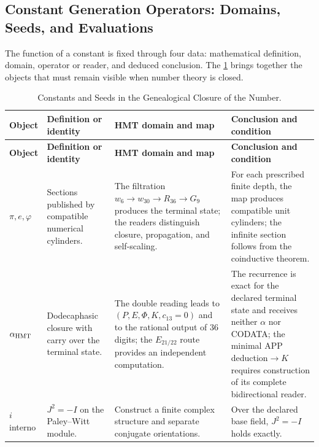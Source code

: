 \subsection{Constant Generation Operators: Domains, Seeds, and Evaluations}

The function of a constant is fixed through four data: mathematical
definition, domain, operator or reader, and deduced conclusion. The
\cref{p3-83-c44-s2:tab:semillas-cierre-genealogico-numero} brings together the objects that must
remain visible when number theory is closed.

\begingroup
\small
\setlength{\LTpre}{0.5\baselineskip}
\setlength{\LTpost}{0.5\baselineskip}
\begin{longtable}{@{}>{\raggedright\arraybackslash}p{}
                    >{\raggedright\arraybackslash}p{}
                    >{\raggedright\arraybackslash}p{}
                    >{\raggedright\arraybackslash}p{}@{}}
\caption{Constants and Seeds in the Genealogical Closure of the Number.}
\label{p3-83-c44-s2:tab:semillas-cierre-genealogico-numero}\\
\toprule
\textbf{Object} & \textbf{Definition or identity} &
\textbf{HMT domain and map} & \textbf{Conclusion and condition}\\
\midrule
\endfirsthead
\toprule
\textbf{Object} & \textbf{Definition or identity} &
\textbf{HMT domain and map} & \textbf{Conclusion and condition}\\
\midrule
\endhead
\(\pi,e,\varphi\) &
Sections published by compatible numerical cylinders. &
The filtration
\(w_6\to w_{30}\to R_{36}\to G_9\) produces the terminal state; the readers
distinguish closure, propagation, and self-scaling. &
For each prescribed finite depth, the map produces compatible unit
cylinders; the infinite section follows from the coinductive theorem.\\
\(\alpha_{\rm HMT}\) &
Dodecaphasic closure with carry over the terminal state. &
The double reading leads to
\((P,E,\Phi,K,c_{13}=0)\) and to the rational output of \(36\) digits; the
\(E_{21/22}\) route provides an independent computation. &
The recurrence is exact for the declared terminal state and receives neither
\(\alpha\) nor CODATA; the minimal APP deduction\(\to K\) requires construction of its
complete bidirectional reader.\\
\(i\) interno &
\(J^2=-I\) on the Paley--Witt module. &
Construct a finite complex structure and separate conjugate orientations. &
Over the declared base field, \(J^2=-I\) holds exactly.\\

\end{longtable}
